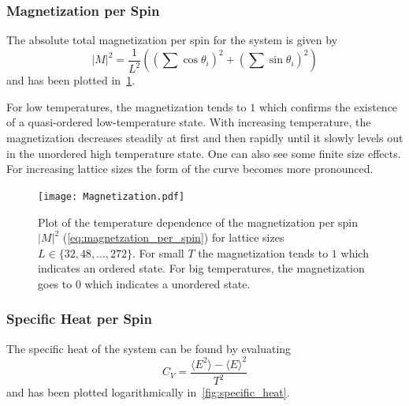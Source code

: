 \subsubsection{Magnetization per Spin}\label{sec:magnetization_per_spin}
The absolute total magnetization per spin for the system is given by
\begin{equation}\label{eq:magnetzation_per_spin}
	{\lvert M \rvert}^2 = \frac{1}{L^2} \left( \left( \sum{\cos{\theta_i}} \right)^2 + \left( \sum{\sin{\theta_i}} \right)^2 \right)
\end{equation}
and has been plotted in~\cref{fig:magnetization_per_spin}.

For low temperatures, the magnetization tends to $\num{1}$ which confirms the existence of a quasi-ordered low-temperature state. With increasing temperature, the magnetization decreases steadily at first and then rapidly until it slowly levels out in the unordered high temperature state. One can also see  some finite size effects. For increasing lattice sizes the form of the curve becomes more pronounced.
\begin{figure}[!htb]
	\centering
	\texttt{[image: Magnetization.pdf]}
	\caption[Temperature dependence of the magnetzation per spin ${\lvert M \rvert}^2$]{Plot of the temperature dependence of the magnetization per spin ${\lvert M \rvert}^2$ (\cref{eq:magnetzation_per_spin}) for lattice sizes $L\in\{32, 48, \dots, 272\}$. For small $T$ the magnetization tends to $1$ which indicates an ordered state. For big temperatures, the magnetization goes to $0$ which indicates a unordered state.}
	\label{fig:magnetization_per_spin}
\end{figure}

\subsubsection{Specific Heat per Spin}\label{sec:specific_heat_per_spin}
The specific heat of the system can be found by evaluating
\begin{equation}\label{eq:specific_heat_per_spin}
	C_V = \frac{\langle E^2 \rangle - {\langle E \rangle}^2}{T^2}
\end{equation}
and has been plotted logarithmically in~\cref{fig:specific_heat}.

